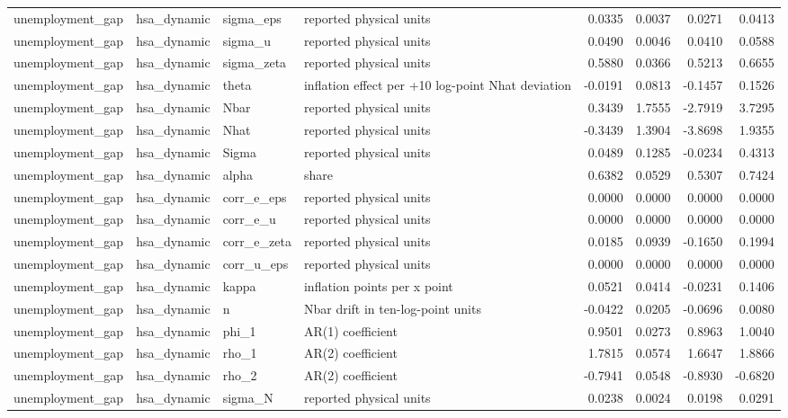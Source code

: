 \begin{tabular}{llllrrrr}
unemployment\_gap & hsa\_dynamic & sigma\_eps & reported physical units & 0.0335 & 0.0037 & 0.0271 & 0.0413 \\
unemployment\_gap & hsa\_dynamic & sigma\_u & reported physical units & 0.0490 & 0.0046 & 0.0410 & 0.0588 \\
unemployment\_gap & hsa\_dynamic & sigma\_zeta & reported physical units & 0.5880 & 0.0366 & 0.5213 & 0.6655 \\
unemployment\_gap & hsa\_dynamic & theta & inflation effect per +10 log-point Nhat deviation & -0.0191 & 0.0813 & -0.1457 & 0.1526 \\
unemployment\_gap & hsa\_dynamic & Nbar & reported physical units & 0.3439 & 1.7555 & -2.7919 & 3.7295 \\
unemployment\_gap & hsa\_dynamic & Nhat & reported physical units & -0.3439 & 1.3904 & -3.8698 & 1.9355 \\
unemployment\_gap & hsa\_dynamic & Sigma & reported physical units & 0.0489 & 0.1285 & -0.0234 & 0.4313 \\
unemployment\_gap & hsa\_dynamic & alpha & share & 0.6382 & 0.0529 & 0.5307 & 0.7424 \\
unemployment\_gap & hsa\_dynamic & corr\_e\_eps & reported physical units & 0.0000 & 0.0000 & 0.0000 & 0.0000 \\
unemployment\_gap & hsa\_dynamic & corr\_e\_u & reported physical units & 0.0000 & 0.0000 & 0.0000 & 0.0000 \\
unemployment\_gap & hsa\_dynamic & corr\_e\_zeta & reported physical units & 0.0185 & 0.0939 & -0.1650 & 0.1994 \\
unemployment\_gap & hsa\_dynamic & corr\_u\_eps & reported physical units & 0.0000 & 0.0000 & 0.0000 & 0.0000 \\
unemployment\_gap & hsa\_dynamic & kappa & inflation points per x point & 0.0521 & 0.0414 & -0.0231 & 0.1406 \\
unemployment\_gap & hsa\_dynamic & n & Nbar drift in ten-log-point units & -0.0422 & 0.0205 & -0.0696 & 0.0080 \\
unemployment\_gap & hsa\_dynamic & phi\_1 & AR(1) coefficient & 0.9501 & 0.0273 & 0.8963 & 1.0040 \\
unemployment\_gap & hsa\_dynamic & rho\_1 & AR(2) coefficient & 1.7815 & 0.0574 & 1.6647 & 1.8866 \\
unemployment\_gap & hsa\_dynamic & rho\_2 & AR(2) coefficient & -0.7941 & 0.0548 & -0.8930 & -0.6820 \\
unemployment\_gap & hsa\_dynamic & sigma\_N & reported physical units & 0.0238 & 0.0024 & 0.0198 & 0.0291 \\

\end{tabular}
